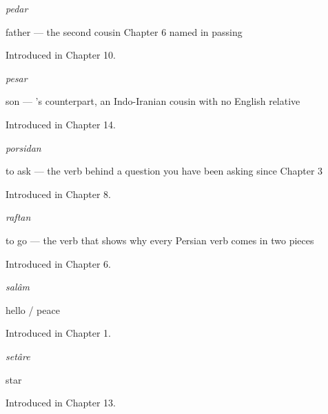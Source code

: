 \noindent\begin{minipage}[t]{\linewidth}
\raggedright
\textbf{}\enspace\emph{pedar}\par
\small father — the second cousin Chapter 6 named in passing\par
\footnotesize Introduced in Chapter 10.
\end{minipage}\par\medskip

\noindent\begin{minipage}[t]{\linewidth}
\raggedright
\textbf{}\enspace\emph{pesar}\par
\small son — 's counterpart, an Indo-Iranian cousin with no English relative\par
\footnotesize Introduced in Chapter 14.
\end{minipage}\par\medskip

\noindent\begin{minipage}[t]{\linewidth}
\raggedright
\textbf{}\enspace\emph{porsidan}\par
\small to ask — the verb behind a question you have been asking since Chapter 3\par
\footnotesize Introduced in Chapter 8.
\end{minipage}\par\medskip

\noindent\begin{minipage}[t]{\linewidth}
\raggedright
\textbf{}\enspace\emph{raftan}\par
\small to go — the verb that shows why every Persian verb comes in two pieces\par
\footnotesize Introduced in Chapter 6.
\end{minipage}\par\medskip

\noindent\begin{minipage}[t]{\linewidth}
\raggedright
\textbf{}\enspace\emph{salâm}\par
\small hello / peace\par
\footnotesize Introduced in Chapter 1.
\end{minipage}\par\medskip

\noindent\begin{minipage}[t]{\linewidth}
\raggedright
\textbf{}\enspace\emph{setâre}\par
\small star\par
\footnotesize Introduced in Chapter 13.
\end{minipage}\par\medskip

